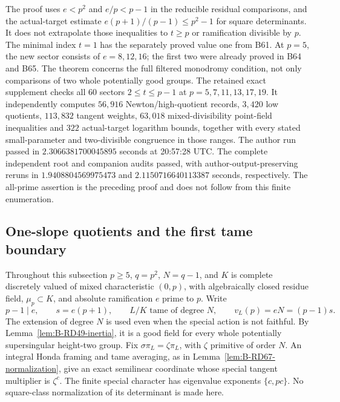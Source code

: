 \begin{remark}
\label{rem:B-RD68-scope}
The proof uses \(e<p^2\) and \(e/p<p-1\) in the reducible
residual comparisons, and the actual-target estimate
\(e(p+1)/(p-1)\le p^2-1\) for square determinants.
It does not extrapolate those inequalities to \(t\ge p\)
or ramification divisible by \(p\).
The minimal index \(t=1\) has the separately proved value one
from B61. At \(p=5\), the new sector consists of \(e=8,12,16\);
the first two were already proved in B64 and B65.
The theorem concerns the full filtered monodromy condition,
not only comparisons of two whole potentially good groups.
The retained exact supplement
checks all \(60\) sectors \(2\le t\le p-1\) at
\(p=5,7,11,13,17,19\). It independently computes
\(56{,}916\) Newton/high-quotient records, \(3{,}420\) low
quotients, \(113{,}832\) tangent weights, \(63{,}018\)
mixed-divisibility point-field inequalities and \(322\)
actual-target logarithm bounds, together with every stated
small-parameter and two-divisible congruence in those ranges.
The author run passed in \(2.3066381700045895\) seconds at
20:57:28 UTC. The complete independent root and companion audits passed, with
author-output-preserving reruns in \(1.9408804569975473\)
and \(2.1150716640113387\) seconds, respectively.
The all-prime assertion is the preceding proof and does not follow
from this finite enumeration.
\end{remark}


\subsection{One-slope quotients and the first tame boundary}

Throughout this subsection \(p\ge5\), \(q=p^2\), \(N=q-1\), and
\(K\) is complete discretely valued of mixed characteristic \((0,p)\),
with algebraically closed residue field, \(\mu_p\subset K\), and
absolute ramification \(e\) prime to \(p\). Write
\[
 p-1\mid e,\qquad s=e(p+1),\qquad
 L/K\text{ tame of degree }N,\qquad v_L(p)=eN=(p-1)s .
 \tag{B-RD69.1}
\]
The extension of degree \(N\) is used even when the special action
is not faithful. By Lemma~\ref{lem:B-RD49-inertia}, it is a good
field for every whole potentially supersingular height-two group.
Fix \(\sigma\pi_L=\zeta\pi_L\), with \(\zeta\) primitive of order \(N\).
An integral Honda framing and tame averaging, as in
Lemma~\ref{lem:B-RD67-normalization}, give an exact semilinear
coordinate whose special tangent multiplier is \(\zeta^c\).
The finite special character has eigenvalue exponents \(\{c,pc\}\).
No square-class normalization of its determinant is made here.

